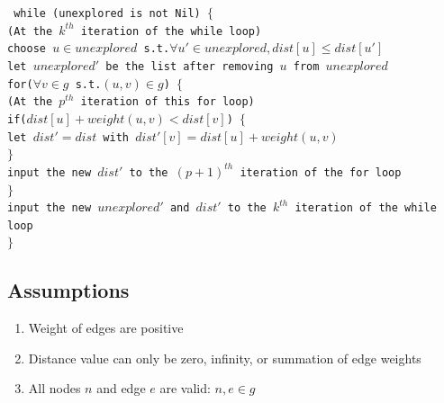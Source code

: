 \documentclass[11pt, oneside]{article}   	%
\newcommand\tab[1][1cm]{\hspace*{#1}}
\theoremstyle{definition}
\begin{document}
\texttt{
  \tab while (unexplored is not Nil) 
  \tab$\{$ \\
  \tab\tab (At the $k^{th}$ iteration of the while loop)                                          \\
  \tab\tab choose $u \in unexplored$ s.t.$\forall u' \in unexplored, dist[u] \leq dist[u']$     \\
  \tab\tab let $unexplored'$ be the list after removing $u$ from $unexplored$                    \\
  \tab\tab for($\forall v \in g$ s.t.$(u, v) \in g$) $\{$                                 \\  
  \tab\tab\tab (At the $p^{th}$ iteration of this for loop)                                \\
  \tab\tab\tab  if($dist[u] + weight(u, v) < dist[v]$) $\{$                              \\
  \tab\tab\tab\tab  let $dist' = dist$ with $dist'[v] = dist[u] + weight(u, v)$          \\
  \tab\tab\tab $\}$ \\ 
  \tab\tab\tab input the new $dist'$ to the $(p+1)^{th}$ iteration of the for loop \\
  \tab\tab $\}$ \\
  \tab\tab input the new $unexplored'$ and $dist'$ to the $k^{th}$ iteration of the while loop \\
  \tab $\}$
}

\subsection{Assumptions}
\begin{enumerate}
  \item Weight of edges are positive
  \item Distance value can only be zero, infinity, or summation of edge weights
  \item All nodes $n$ and edge $e$ are valid: $n, e \in g$
\end{enumerate}
\end{document}
